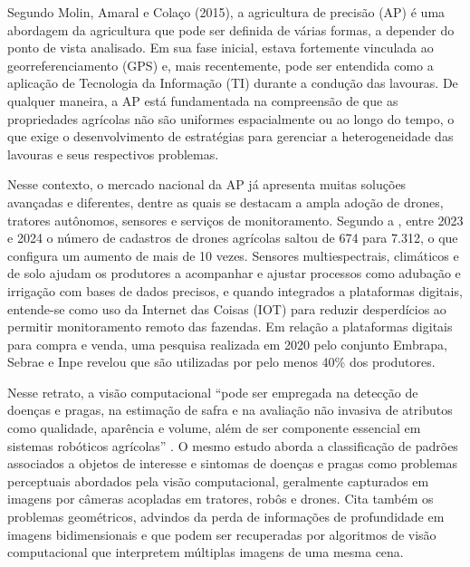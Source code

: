 Segundo Molin, Amaral e Colaço (2015), a agricultura de precisão (AP) é uma abordagem da agricultura que pode ser definida de várias formas, a depender do ponto de vista analisado. Em sua fase inicial, estava fortemente vinculada ao georreferenciamento (GPS) e, mais recentemente, pode ser entendida como a aplicação de Tecnologia da Informação (TI) durante a condução das lavouras. De qualquer maneira, a AP está fundamentada na compreensão de que as propriedades agrícolas não são uniformes espacialmente ou ao longo do tempo, o que exige o desenvolvimento de estratégias para gerenciar a heterogeneidade das lavouras e seus respectivos problemas.

Nesse contexto, o mercado nacional da AP já apresenta muitas soluções avançadas e diferentes, dentre as quais se destacam a ampla adoção de drones, tratores autônomos, sensores e serviços de monitoramento. Segundo a \textcite{ANAC2025}, entre 2023 e 2024 o número de cadastros de drones agrícolas saltou de 674 para 7.312, o que configura um aumento de mais de 10 vezes. Sensores multiespectrais, climáticos e de solo ajudam os produtores a acompanhar e ajustar processos como adubação e irrigação com bases de dados precisos, e quando integrados a plataformas digitais, entende-se como uso da Internet das Coisas (IOT) para reduzir desperdícios ao permitir monitoramento remoto das fazendas. Em relação a plataformas digitais para compra e venda, uma pesquisa realizada em 2020 pelo conjunto Embrapa, Sebrae e Inpe revelou que são utilizadas por pelo menos 40\% dos produtores. 

Nesse retrato,  a visão computacional “pode ser empregada na detecção de doenças e pragas, na estimação de safra e na avaliação não invasiva de atributos como qualidade, aparência e volume, além de ser componente essencial em sistemas robóticos agrícolas” \cite{santos2020visao}. O mesmo estudo aborda a classificação de padrões associados a objetos de interesse e sintomas de doenças e pragas como problemas  perceptuais abordados pela visão computacional, geralmente capturados em imagens por câmeras acopladas em tratores, robôs e drones. Cita também os problemas geométricos, advindos da perda de informações de profundidade em imagens bidimensionais e que podem ser recuperadas por algoritmos de visão computacional que interpretem múltiplas imagens de uma mesma cena.

